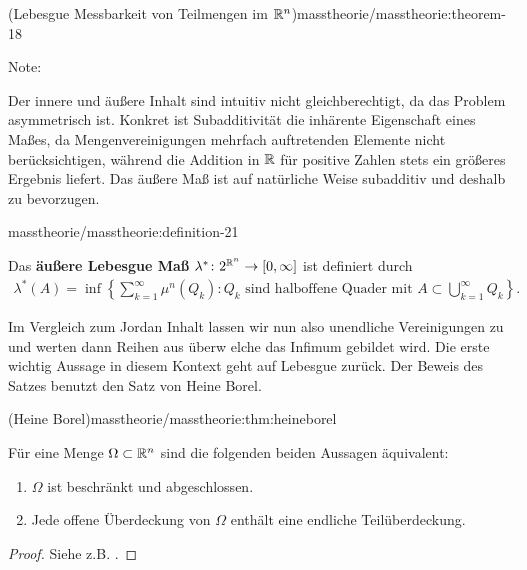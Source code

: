\begin{theorem}{(Lebesgue Messbarkeit von Teilmengen im \protect\(\mathbb{R}^n\protect\))}{masstheorie/masstheorie:theorem-18}
\begin{emphBox}{}{}{Note:}
\par
Der innere und äußere Inhalt sind intuitiv nicht gleichberechtigt, da das Problem asymmetrisch ist. Konkret ist Subadditivität die inhärente Eigenschaft eines Maßes, da Mengenvereinigungen mehrfach auftretenden Elemente nicht berücksichtigen, während die Addition in \(\mathbb{R}\) für positive Zahlen stets ein größeres Ergebnis liefert. Das äußere Maß ist auf natürliche Weise subadditiv und deshalb zu bevorzugen.
\end{emphBox}
\begin{definition}{}{masstheorie/masstheorie:definition-21}



\par
Das \textbf{äußere Lebesgue Maß} \(\lambda^* \colon 2^{\mathbb{R}^n} \rightarrow [0,\infty]\) ist definiert durch
\begin{align*}
\lambda^*(A) = \inf \left\{ \sum_{k=1}^\infty \mu^n(Q_k) : Q_k \text{ sind halboffene Quader mit } A \subset \bigcup_{k=1}^\infty Q_k \right\}.
\end{align*}\end{definition}

\par
Im Vergleich zum Jordan Inhalt lassen wir nun also unendliche Vereinigungen zu und werten dann Reihen aus überw elche das Infimum gebildet wird. Die erste wichtig Aussage in diesem Kontext geht auf Lebesgue zurück. Der Beweis des Satzes benutzt den Satz von Heine Borel.
\begin{theorem}{(Heine Borel)}{masstheorie/masstheorie:thm:heineborel}



\par
Für eine Menge \(\Omega\subset\mathbb{R}^n\) sind die folgenden beiden Aussagen äquivalent:
\begin{enumerate}

\item {} 
\par
\(\Omega\) ist beschränkt und abgeschlossen.

\item {} 
\par
Jede offene Überdeckung von \(\Omega\) enthält eine endliche Teilüberdeckung.

\end{enumerate}
\end{theorem}

\begin{proof}
 Siehe z.B. \cite{For17}.
\end{proof}


\end{theorem}
